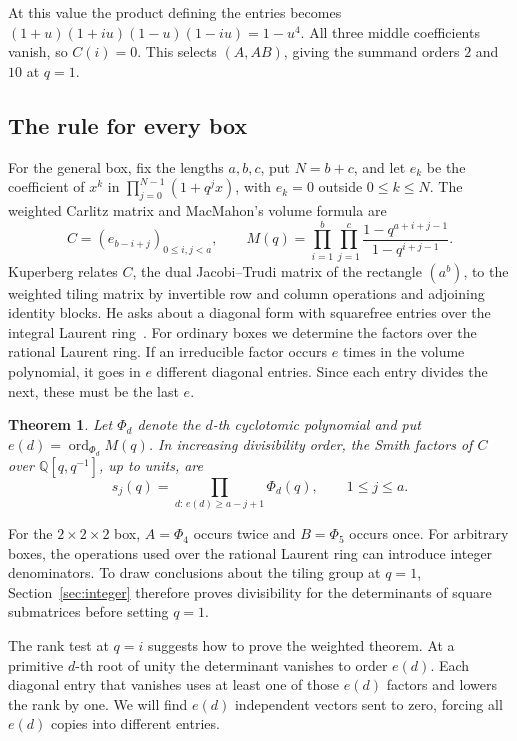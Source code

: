 \documentclass[11pt]{article}
\newtheorem{theorem}{Theorem}
\newcommand{\Q}{\mathbb Q}
\newcommand{\ord}{\operatorname{ord}}
\newcommand{\laur}{\Q[q,q^{-1}]}
\begin{document}
At this value the product defining the entries becomes
\((1+u)(1+iu)(1-u)(1-iu)=1-u^4\). All three middle coefficients
vanish, so \(C(i)=0\). This selects \((A,AB)\), giving the summand
orders \(2\) and \(10\) at \(q=1\).

\subsection*{The rule for every box}

For the general box, fix the lengths \(a,b,c\), put \(N=b+c\), and
let \(e_k\) be the coefficient of \(x^k\) in
\(\prod_{j=0}^{N-1}(1+q^j x)\), with \(e_k=0\) outside \(0\le k\le N\).
The weighted Carlitz matrix and MacMahon's volume formula
\cite[\S429]{MacMahon} are
\[
 C=(e_{b-i+j})_{0\le i,j<a}, \qquad
 M(q)=\prod_{i=1}^{b}\prod_{j=1}^{c}
          \frac{1-q^{a+i+j-1}}{1-q^{i+j-1}}.
\]
Kuperberg relates \(C\), the dual Jacobi--Trudi matrix of the
rectangle \((a^b)\), to the weighted tiling matrix by invertible row
and column operations and adjoining identity blocks. He asks about
a diagonal form with squarefree entries over the integral Laurent
ring~\cite[Theorem~14 and Conjectures~11--12]{Kuperberg}. For ordinary
boxes we determine the factors over the rational Laurent ring.
If an irreducible factor occurs \(e\) times in the volume
polynomial, it goes in \(e\) different diagonal entries. Since each
entry divides the next, these must be the last \(e\).

\begin{theorem}\label{thm:smith}
Let \(\Phi_d\) denote the \(d\)-th cyclotomic polynomial and put
\(e(d)=\ord_{\Phi_d}M(q)\). In increasing divisibility order, the Smith
factors of \(C\) over \(\laur\), up to units, are
\[
             s_j(q)=\prod_{d:\,e(d)\ge a-j+1}\Phi_d(q),
             \qquad 1\le j\le a .
\]
\end{theorem}

For the \(2\times2\times2\) box, \(A=\Phi_4\) occurs twice and \(B=\Phi_5\) occurs
once. For arbitrary boxes, the operations used over the rational
Laurent ring can introduce integer denominators. To draw conclusions
about the tiling group at \(q=1\), Section~\ref{sec:integer}
therefore proves divisibility for the determinants of square
submatrices before setting \(q=1\).

The rank test at \(q=i\) suggests how to prove the weighted theorem.
At a primitive \(d\)-th root of unity the determinant vanishes to
order \(e(d)\). Each diagonal entry that vanishes uses at least one
of those \(e(d)\) factors and lowers the rank by one. We will find
\(e(d)\) independent vectors sent to zero, forcing all \(e(d)\)
copies into different entries.
\end{document}
